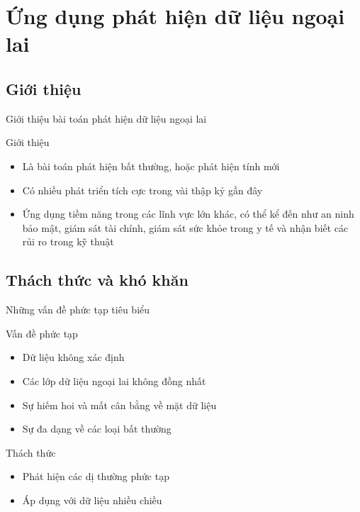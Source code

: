 \documentclass[
	10pt,                %
	aspectratio=169,     %
]{beamer}
\begin{document}
    
    

    
\section{Ứng dụng phát hiện dữ liệu ngoại lai}
\subsection{Giới thiệu}
	\begin{frame}{Giới thiệu bài toán phát hiện dữ liệu ngoại lai}
        \begin{block}{Giới thiệu}
    	\begin{itemize}
            \item  Là bài toán phát hiện bất thường, hoặc phát hiện tính mới
            \item Có nhiều phát triển tích cực trong vài thập
                kỷ gần đây
            \item Ứng dụng tiềm năng trong các lĩnh vực lớn khác, có thể kể đến như an ninh bảo mật, giám sát
tài chính, giám sát sức khỏe trong y tế và nhận biết các rủi ro trong kỹ thuật
           
    	\end{itemize}
        \end{block}
    \end{frame}	
    
\subsection{Thách thức và khó khăn}

	\begin{frame}{Những vấn đề phức tạp tiêu biểu}
        \begin{block}{Vấn đề phức tạp}
    	\begin{itemize}
            \item  Dữ liệu không xác định   
            \item Các lớp dữ liệu ngoại lai không đồng nhất
            \item Sự hiếm hoi và mất cân bằng về mặt dữ liệu
            \item Sự đa dạng về các loại bất thường
           
    	\end{itemize}
        \end{block}
        
        \begin{block}{Thách thức}
    	\begin{itemize}
            \item  Phát hiện các dị thường phức tạp
            \item Áp dụng với dữ liệu nhiều chiều
    	\end{itemize}
        \end{block}
    \end{frame}	
    
\end{document}
